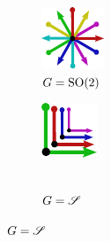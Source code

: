 \begin{figure}
\begin{subfigure}[b]{0.14\textwidth}
        \includegraphics[width=.8\textwidth]{figures/GpM_SO2.pdf}
        \caption{\small
            $G=\operatorname{SO}(2)$
        }
        \label{fig:GpM_c}
    \end{subfigure}
    \hspace*{.5ex}
    \begin{subfigure}[b]{0.14\textwidth}
        \centering
        \includegraphics[width=.66\textwidth]{figures/GpM_scale.pdf}
        \\~\vspace*{-6pt}
        \caption{\small
            $G=\mathscr{S}$
        }
        \label{fig:GpM_d}
    \end{subfigure}
    \par

\end{figure}
